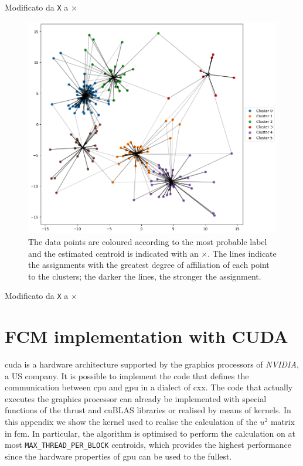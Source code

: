 \begin{modified}
Modificato da \texttt{X} a $\times$
\end{modified}
\begin{figure}[h]
    \centering
    \includegraphics[width=0.9\linewidth]{Figures/dati_fcm.png}
    \caption[Example of \gls{fcm} clustering]{The data points are coloured according to the most probable label and the estimated centroid is indicated with an $\times$. The lines indicate the assignments with the greatest degree of affiliation of each point to the clusters; the darker the lines, the stronger the assignment.}
    \label{fig:data_fcm}
\end{figure}
\begin{modified}
Modificato da \texttt{X} a $\times$
\end{modified}

\chapter{FCM implementation with CUDA} \label{appendix:fcm_kernel}
\gls{cuda} is a hardware architecture supported by the graphics processors of \emph{NVIDIA}, a US company. It is possible to implement the code that defines the communication between \gls{cpu} and \gls{gpu} in a dialect of \gls{cxx}. The code that actually executes the graphics processor can already be implemented with special functions of the \gls{thrust} and \gls{cuBLAS} libraries or realised by means of kernels. In this appendix we show the kernel used to realise the calculation of the $u^2$ matrix in \gls{fcm}. In particular, the algorithm is optimised to perform the calculation on at most \texttt{MAX\_THREAD\_PER\_BLOCK} centroids, which provides the highest performance since the hardware properties of \gls{gpu} can be used to the fullest.

